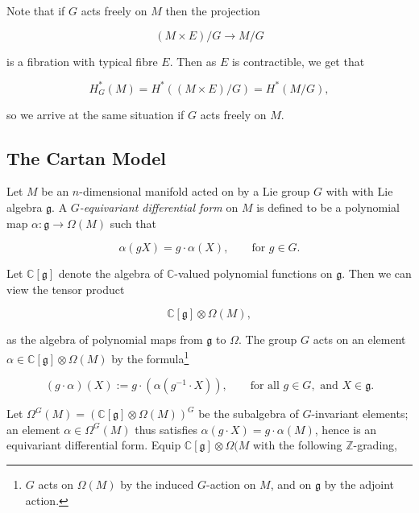 \documentclass{article}
\newcommand{\ra}{\rightarrow}
\newcommand{\lra}{\longrightarrow}
\newcommand{\W}{\Omega}
\newcommand{\CC}{\mathbb{C}}
\newcommand{\ZZ}{\mathbb{Z}}
\newcommand{\mfg}{\mathfrak{g}}
\begin{document}
Note that if $G$ acts freely on $M$ then the projection

\begin{equation*}
	(M \times E)/G \lra M/G
\end{equation*}

is a fibration with typical fibre $E$. Then as $E$ is contractible, we get that

\begin{equation*}
	H_{G}^{\ast}(M) = H^{\ast}\left( (M \times E)/G \right) = H^{\ast}(M/G),
\end{equation*}

so we arrive at the same situation if $G$ acts freely on $M$.

\subsection{The Cartan Model}

Let $M$ be an $n$-dimensional manifold acted on by a Lie group $G$ with with Lie algebra $\mfg$. A \emph{$G$-equivariant differential form} on $M$ is defined to be a polynomial map $\alpha : \mfg \ra \W(M)$ such that

\begin{equation*}
	\alpha(gX) = g \cdot \alpha(X), \qquad \text{for } g \in G.
\end{equation*}

Let $\CC[\mfg]$ denote the algebra of $\CC$-valued polynomial functions on $\mfg$. Then we can view the tensor product

\begin{equation*}
	\CC[\mfg] \otimes \W(M),
\end{equation*}

as the algebra of polynomial maps from $\mfg$ to $\W$. The group $G$ acts on an element $\alpha \in \CC[\mfg] \otimes \W(M)$ by the formula\footnote{$G$ acts on $\W(M)$ by the induced $G$-action on $M$, and on $\mfg$ by the adjoint action.}

\begin{equation*}
	(g \cdot \alpha)(X) := g \cdot \left( \alpha ( g^{-1} \cdot X )  \right), \qquad \text{for all } g \in G, \text{ and } X \in \mfg.
\end{equation*}

Let $\W^{G}(M) = \left( \CC[\mfg] \otimes \W(M) \right)^{G}$ be the subalgebra of $G$-invariant elements; an element $\alpha \in \W^{G}(M)$ thus satisfies $\alpha(g \cdot X) = g\cdot \alpha(M)$, hence is an equivariant differential form. Equip $\CC[\mfg] \otimes \W(M$ with the following $\ZZ$-grading,
\end{document}
